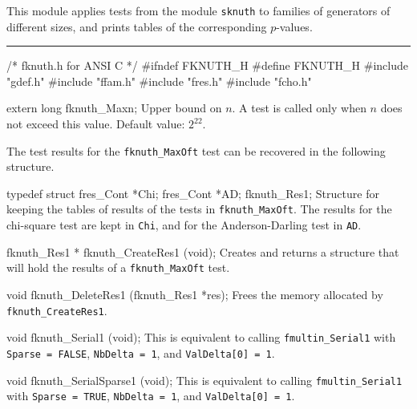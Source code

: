 
This module applies tests from the module {\tt sknuth}
to families of generators of different sizes, 
and prints tables of the corresponding $p$-values.


\bigskip
\hrule
\code\hide
/* fknuth.h for ANSI C */
#ifndef FKNUTH_H
#define FKNUTH_H
\endhide
#include "gdef.h"
#include "ffam.h"
#include "fres.h"
#include "fcho.h"


extern long fknuth_Maxn;
\endcode
\tab
  Upper bound on $n$.
  A test is called only when $n$ does not exceed this value.
  Default value: $2^{22}$.
\endtab
\ifdetailed  %



The test results for the {\tt fknuth\_MaxOft} test can be recovered
in the following structure.

\code

typedef struct {
   fres_Cont *Chi;
   fres_Cont *AD;
} fknuth_Res1;
\endcode
 \tab
  Structure for keeping the tables of results of the tests in
  {\tt fknuth\_MaxOft}. The results for the chi-square test are kept in
  {\tt Chi}, and for the Anderson-Darling test in  {\tt AD}.
 \endtab
\code


fknuth_Res1 * fknuth_CreateRes1 (void);
\endcode
 \tab 
  Creates and returns a structure that will hold the results
  of a  {\tt fknuth\_MaxOft} test. 
 \endtab
\code


void fknuth_DeleteRes1 (fknuth_Res1 *res);
\endcode
 \tab 
  Frees the memory allocated by {\tt fknuth\_CreateRes1}.
 \endtab

\fi    %


\code

void fknuth_Serial1 (void);
\endcode
\tab This is equivalent to calling 
 {\tt fmultin\_Serial1} with {\tt Sparse = FALSE}, 
  {\tt NbDelta = 1}, and {\tt Val\-Delta[0] = 1}.
 \endtab
\code


void fknuth_SerialSparse1 (void);
\endcode
\tab This is equivalent to calling {\tt fmultin\_Serial1} with 
  {\tt Sparse = TRUE},  {\tt NbDelta = 1}, and {\tt Val\-Delta[0] = 1}.
 \endtab
\code


